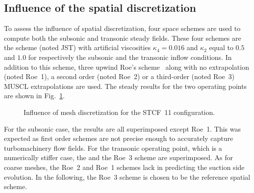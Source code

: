\subsection{Influence of the spatial discretization}
To assess the influence of spatial discretization, four space schemes are
used to compute both the subsonic and transonic steady fields. These
four schemes are the \citet{Jameson1981} scheme (noted JST) with artificial
viscosities $\kappa_4 = 0.016$
and $\kappa_2$ equal to $0.5$ and $1.0$ for respectively the subsonic and the transonic
inflow conditions. In addition to this scheme, three upwind
Roe's scheme~\cite{Roe1981} along with no extrapolation (noted Roe~1),
a second order (noted Roe~2) or a third-order (noted Roe~3) 
MUSCL extrapolations are used.
The steady results for the two operating points are shown 
in Fig.~\ref{fig:stcf11_space_scheme_convergence}.
\begin{figure}[htb!]
  \centering
  \caption{Influence of mesh discretization for the STCF~11 configuration.}
  \label{fig:stcf11_space_scheme_convergence}
\end{figure}
For the subsonic case, the results are all superimposed except Roe~1. 
This was expected as first order schemes
are not precise enough to accurately capture turbomachinery flow fields.
For the transonic operating point, which is a numerically stiffer case,
the \citet{Jameson1981} and the Roe~3 scheme are superimposed.
As for coarse meshes, the Roe~2 and Roe~1 schemes
lack in predicting the suction side evolution. In the following,
the Roe~3 scheme is chosen to be the reference spatial scheme.
